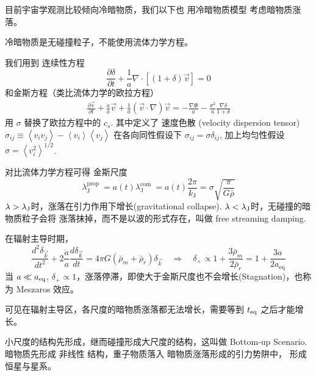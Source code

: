 \documentclass[12pt]{ctexart}
\begin{document}
目前宇宙学观测比较倾向冷暗物质，我们以下也 用冷暗物质模型 考虑暗物质涨落。

冷暗物质是无碰撞粒子，不能使用流体力学方程。

我们用到
连续性方程
\begin{equation}
    \frac{\partial \delta}{\partial t}+\frac{1}{a} \nabla \cdot[(1+\delta) \vec{v}]=0
\end{equation}
和金斯方程（类比流体力学的欧拉方程）
\begin{eqnarray}
    \frac{\partial \vec{v}}{\partial t}+\frac{\dot{a}}{a} \vec{v}+\frac{1}{a}(\vec{v} \cdot \nabla) \vec{v} =-\frac{\nabla \Phi}{a} - \frac{\sigma^2}{a}\frac{\nabla \delta}{1+\delta}
\end{eqnarray}
用 $\sigma$ 替换了欧拉方程中的 $c_s$.
其中定义了 速度色散 (velocity dispersion tensor)
$\sigma_{ij} \equiv\left\langle v_{i} v_{j}\right\rangle-\left\langle v_{i}\right\rangle\left\langle v_{j}\right\rangle$
在各向同性假设下 $\sigma_{ij}=\sigma\delta_{ij}$,
加上均匀性假设 $\sigma=\left\langle v_i^2 \right\rangle ^{1/2}$.

对比流体力学方程可得 金斯尺度 
\begin{equation}
    \lambda_{\mathrm{J}}^{\text {prop }}=a(t) \lambda_{\mathrm{J}}^{\text {com }}=a(t) \frac{2 \pi}{k_{\mathrm{J}}}=\sigma \sqrt{\frac{\pi}{G \bar{\rho}}}
\end{equation}
$\lambda > \lambda_{\rm{J}}$时，涨落在引力作用下增长(gravitational collapse).
$\lambda < \lambda_{\rm{J}}$时，无碰撞的暗物质粒子会将 涨落抹掉，而不是以波的形式存在，叫做 free streaming damping.


在辐射主导时期，
\begin{equation}
    \frac{d^{2} \delta_{\vec{k}} }{d t^{2}}+2 \frac{\dot{a}}{a} \frac{d \delta_{\vec{k}}}{d t}=4 \pi G\left(\bar{\rho}_{m}+\bar{\rho}_{r}\right) \delta_{\vec{k}} \quad \Rightarrow \quad \delta_{+} \propto 1+\frac{3 \bar{\rho}_{m}}{2 \bar{\rho}_{r}}=1+\frac{3 a}{2 a_{\mathrm{eq}}} 
\end{equation}
当 $a\ll a_{\rm{eq}}$, $\delta_{+}\propto 1$，涨落停滞，即使大于金斯尺度也不会增长(Stagnation)，也称为 Meszaros 效应。

可见在辐射主导区，各尺度的暗物质涨落都无法增长，需要等到 $t_{\rm{eq}}$ 之后才能增长。

小尺度的结构先形成，继而碰撞形成大尺度的结构，这叫做 Bottom-up Scenario.
暗物质先形成 非线性 结构，重子物质落入 暗物质涨落形成的引力势阱中，
形成恒星与星系。
\end{document}
